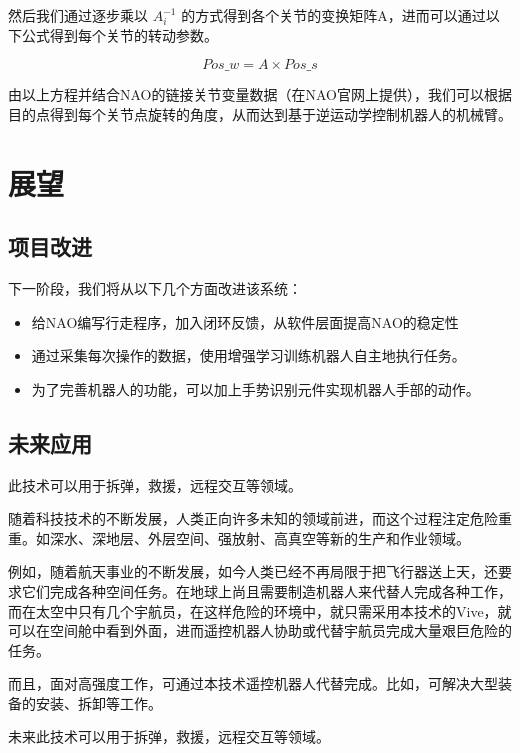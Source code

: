 然后我们通过逐步乘以 $ A_i^{-1} $ 的方式得到各个关节的变换矩阵A，进而可以通过以下公式得到每个关节的转动参数。

\begin{equation}
{Pos\_w = A} \times {Pos\_s}
\end{equation}

由以上方程并结合NAO的链接关节变量数据（在NAO官网上提供），我们可以根据目的点得到每个关节点旋转的角度，从而达到基于逆运动学控制机器人的机械臂。


\chapter{展望}

\section{项目改进}
下一阶段，我们将从以下几个方面改进该系统：
\begin{itemize}
    \item 给NAO编写行走程序，加入闭环反馈，从软件层面提高NAO的稳定性
    \item 通过采集每次操作的数据，使用增强学习训练机器人自主地执行任务。
    \item 为了完善机器人的功能，可以加上手势识别元件实现机器人手部的动作。
\end{itemize}

\section{未来应用}
此技术可以用于拆弹，救援，远程交互等领域。

随着科技技术的不断发展，人类正向许多未知的领域前进，而这个过程注定危险重重。如深水、深地层、外层空间、强放射、高真空等新的生产和作业领域。

例如，随着航天事业的不断发展，如今人类已经不再局限于把飞行器送上天，还要求它们完成各种空间任务。在地球上尚且需要制造机器人来代替人完成各种工作，而在太空中只有几个宇航员，在这样危险的环境中，就只需采用本技术的Vive，就可以在空间舱中看到外面，进而遥控机器人协助或代替宇航员完成大量艰巨危险的任务。

而且，面对高强度工作，可通过本技术遥控机器人代替完成。比如，可解决大型装备的安装、拆卸等工作。
 
未来此技术可以用于拆弹，救援，远程交互等领域。